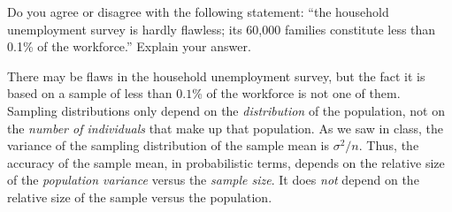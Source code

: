 \documentclass[addpoints,12pt]{exam}
\begin{document}
\begin{questions}
	
\question Do you agree or disagree with the following statement: ``the household unemployment survey is hardly flawless; its 60,000 families constitute less than 0.1\% of the workforce.'' Explain your answer.
	\begin{solution}
	There may be flaws in the household unemployment survey, but the fact it is based on a sample of less than $0.1$\% of the workforce is not one of them. Sampling distributions only depend on the \emph{distribution} of the population, not on the \emph{number of individuals} that make up that population. As we saw in class, the variance of the sampling distribution of the sample mean is $\sigma^2/n$. Thus, the accuracy of the sample mean, in probabilistic terms, depends on the relative size of the \emph{population variance} versus the \emph{sample size}. It does \emph{not} depend on the relative size of the sample versus the population. 
	\end{solution}


\end{questions}
\end{document}
